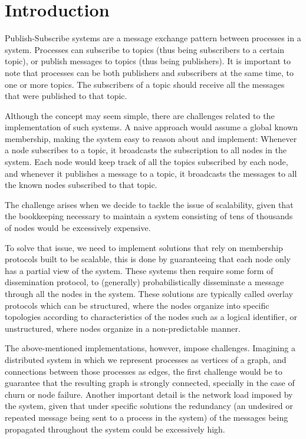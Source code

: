 \documentclass[sigconf]{acmart}
\begin{document}
\section{Introduction}

Publish-Subscribe systems are a message exchange pattern between processes in a system. Processes can subscribe to topics (thus being subscribers to a certain topic), or publish messages to topics (thus being publishers). It is important to note that processes can be both publishers and subscribers at the same time, to one or more topics. The subscribers of a topic should receive all the messages that were published to that topic.

Although the concept may seem simple, there are challenges related to the implementation of such systems. A naive approach would assume a global known membership, making the system easy to reason about and implement:
Whenever a node subscribes to a topic, it broadcasts the subscription to all nodes in the system. Each node would keep track of all the topics subscribed by each node, and whenever it publishes a message to a topic, it broadcasts the messages to all the known nodes subscribed to that topic. 

The challenge arises when we decide to tackle the issue of scalability, given that the bookkeeping necessary to maintain a system consisting of tens of thousands of nodes would be excessively expensive.

To solve that issue, we need to implement solutions that rely on membership protocols built to be scalable, this is done by guaranteeing that each node only has a partial view of the system. These systems then require some form of dissemination protocol, to (generally) probabilistically disseminate a message through all the nodes in the system. 
These solutions are typically called overlay protocols which can be structured, where the nodes organize into specific topologies according to characteristics of the nodes such as a logical identifier, or unstructured, where nodes organize in a non-predictable manner.

The above-mentioned implementations, however, impose challenges. Imagining a distributed system in which we represent processes as vertices of a graph, and connections between those processes as edges, the first challenge would be to guarantee that the resulting graph is strongly connected, specially in the case of churn or node failure. Another important detail is the network load imposed by the system, given that under specific solutions the redundancy (an undesired or repeated message being sent to a process in the system) of the messages being propagated throughout the system could be excessively high. 
\end{document}
